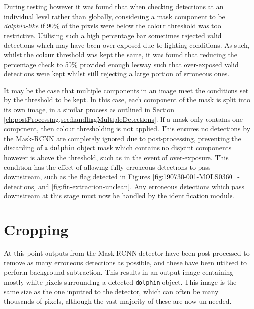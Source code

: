 During testing however it was found that when checking detections at an individual level rather than globally, considering a mask component to be \textit{dolphin-like} if 90\% of the pixels were below the colour threshold was too restrictive. Utilising such a high percentage bar sometimes rejected valid detections which may have been over-exposed due to lighting conditions. As such, whilst the colour threshold was kept the same, it was found that reducing the percentage check to 50\% provided enough leeway such that over-exposed valid detections were kept whilst still rejecting a large portion of erroneous ones. 


It may be the case that multiple components in an image meet the conditions set by the threshold to be kept. In this case, each component of the mask is split into its own image, in a similar process as outlined in Section \ref{ch:postProcessing,sec:handlingMultipleDetections}. If a mask only contains one component, then colour thresholding is not applied. This ensures no detections by the Mask-RCNN are completely ignored due to post-processing, preventing the discarding of a \texttt{dolphin} object mask which contains no disjoint components however is above the threshold, such as in the event of over-exposure. This condition has the effect of allowing fully erroneous detections to pass downstream, such as the flag detected in Figures \ref{fig:190730-001-MOLS0360_-detections} and \ref{fig:fin-extraction-unclean}. Any erroneous detections which pass downstream at this stage must now be handled by the identification module.

\section{Cropping}\label{ch:postProcessing,sec:cropping}

At this point outputs from the Mask-RCNN detector have been post-processed to remove as many erroneous detections as possible, and these have been utilised to perform background subtraction. This results in an output image containing mostly white pixels surrounding a detected \texttt{dolphin} object. This image is the same size as the one inputted to the detector, which can often be many thousands of pixels, although the vast majority of these are now un-needed.


